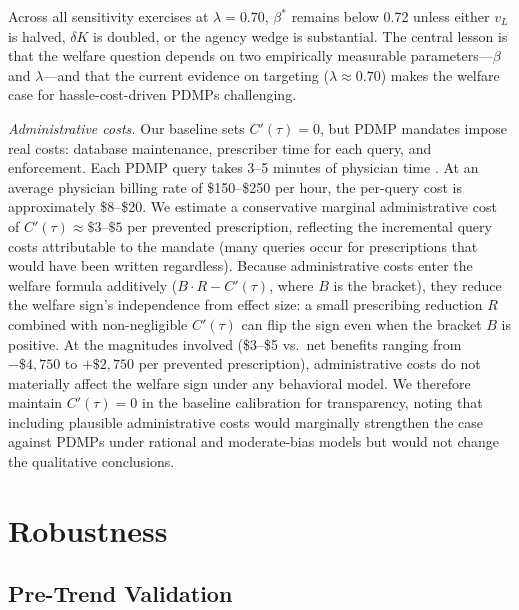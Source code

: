\documentclass[12pt]{article}
\begin{document}
Across all sensitivity exercises at $\lambda = 0.70$, $\beta^*$ remains below 0.72 unless either $v_L$ is halved, $\delta K$ is doubled, or the agency wedge is substantial. The central lesson is that the welfare question depends on two empirically measurable parameters---$\beta$ and $\lambda$---and that the current evidence on targeting ($\lambda \approx 0.70$) makes the welfare case for hassle-cost-driven PDMPs challenging.

\textit{Administrative costs.} Our baseline sets $C'(\tau) = 0$, but PDMP mandates impose real costs: database maintenance, prescriber time for each query, and enforcement. Each PDMP query takes 3--5 minutes of physician time \citep{buchmueller2018effect}. At an average physician billing rate of \$150--\$250 per hour, the per-query cost is approximately \$8--\$20. We estimate a conservative marginal administrative cost of $C'(\tau) \approx \$3$--$\$5$ per prevented prescription, reflecting the incremental query costs attributable to the mandate (many queries occur for prescriptions that would have been written regardless). Because administrative costs enter the welfare formula additively ($B \cdot R - C'(\tau)$, where $B$ is the bracket), they reduce the welfare sign's independence from effect size: a small prescribing reduction $R$ combined with non-negligible $C'(\tau)$ can flip the sign even when the bracket $B$ is positive. At the magnitudes involved (\$3--\$5 vs.\ net benefits ranging from $-\$4{,}750$ to $+\$2{,}750$ per prevented prescription), administrative costs do not materially affect the welfare sign under any behavioral model. We therefore maintain $C'(\tau) = 0$ in the baseline calibration for transparency, noting that including plausible administrative costs would marginally strengthen the case against PDMPs under rational and moderate-bias models but would not change the qualitative conclusions.


\section{Robustness}\label{sec:robustness}

\subsection{Pre-Trend Validation}\label{sec:robust_pretrend}
\end{document}
